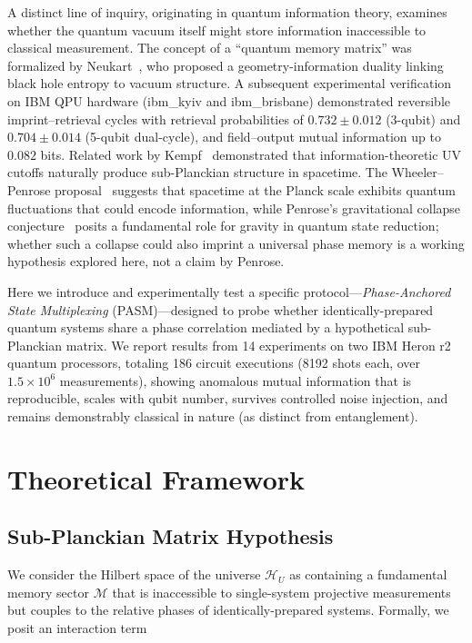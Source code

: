 ﻿\documentclass[12pt,a4paper]{article}
\begin{document}
A distinct line of inquiry, originating in quantum information theory, examines whether the quantum vacuum itself might store information inaccessible to classical measurement. The concept of a ``quantum memory matrix'' was formalized by Neukart~\cite{neukart2025}, who proposed a geometry-information duality linking black hole entropy to vacuum structure. A subsequent experimental verification~\cite{neukart2026qip} on IBM QPU hardware (ibm\_kyiv and ibm\_brisbane) demonstrated reversible imprint--retrieval cycles with retrieval probabilities of $0.732 \pm 0.012$ (3-qubit) and $0.704 \pm 0.014$ (5-qubit dual-cycle), and field--output mutual information up to $0.082$ bits. Related work by Kempf~\cite{kempf2009} demonstrated that information-theoretic UV cutoffs naturally produce sub-Planckian structure in spacetime. The Wheeler--Penrose proposal~\cite{wheeler1957,penrose1996} suggests that spacetime at the Planck scale exhibits quantum fluctuations that could encode information, while Penrose's gravitational collapse conjecture~\cite{penrose1996} posits a fundamental role for gravity in quantum state reduction; whether such a collapse could also imprint a universal phase memory is a working hypothesis explored here, not a claim by Penrose.

Here we introduce and experimentally test a specific protocol---\textit{Phase-Anchored State Multiplexing} (PASM)---designed to probe whether identically-prepared quantum systems share a phase correlation mediated by a hypothetical sub-Planckian matrix. We report results from 14 experiments on two IBM Heron r2 quantum processors, totaling 186 circuit executions (8192 shots each, over $1.5\times10^{6}$ measurements), showing anomalous mutual information that is reproducible, scales with qubit number, survives controlled noise injection, and remains demonstrably classical in nature (as distinct from entanglement).

\section{Theoretical Framework}
\label{sec:theory}

\subsection{Sub-Planckian Matrix Hypothesis}

We consider the Hilbert space of the universe $\mathcal{H}_U$ as containing a fundamental memory sector $\mathcal{M}$ that is inaccessible to single-system projective measurements but couples to the relative phases of identically-prepared systems. Formally, we posit an interaction term
\end{document}
